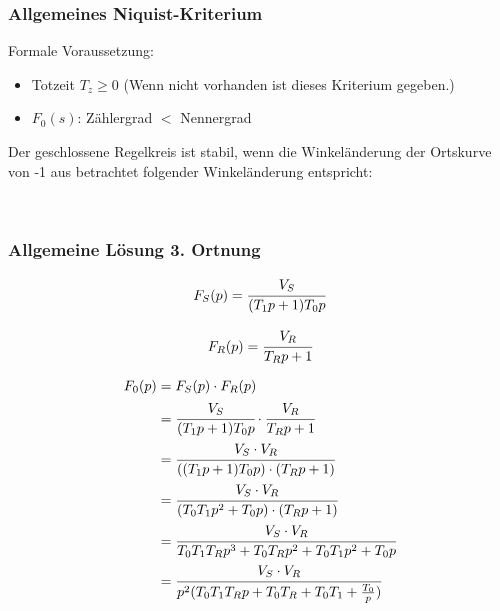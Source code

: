 \subsubsection{Allgemeines Niquist-Kriterium}

Formale Voraussetzung:

\begin{itemize}
 \item Totzeit $T_z \ge 0$ (Wenn nicht vorhanden ist dieses Kriterium gegeben.)
 \item $F_0(s)$: Zählergrad $<$ Nennergrad
\end{itemize}

Der geschlossene Regelkreis ist stabil, wenn die Winkeländerung der Ortskurve von -1 aus betrachtet folgender Winkeländerung entspricht:

\begin{minipage}{0.45\textwidth}

 \\
\end{minipage}
\begin{minipage}{0.45\textwidth}

\end{minipage}

\subsubsection{Allgemeine Lösung 3. Ortnung}

\begin{minipage}{.45\textwidth}
 \begin{equation} \label{Fstrecke}
  F_S(p) = \cfrac{V_S}{(T_1p+1)T_0p} 
\end{equation}
\end{minipage}
\begin{minipage}{.45\textwidth}
\begin{equation} \label{Fregler}
  F_R(p) = \cfrac{V_R}{T_Rp+1} 
\end{equation}
\end{minipage}

\begin{equation} \label{eg1}
\begin{split}
 F_0(p) &= F_S(p) \cdot F_R(p) \\
 &=  \cfrac{V_S}{(T_1p+1)T_0p} \cdot \cfrac{V_R}{T_Rp+1} \\
 &= \cfrac{V_S\cdot V_R}{((T_1p+1)T_0p) \cdot (T_Rp+1)} \\
 &= \cfrac{V_S\cdot V_R}{(T_0T_1p^2+T_0p) \cdot (T_Rp+1)} \\
 &= \cfrac{V_S\cdot V_R}{T_0T_1T_Rp^3+T_0T_Rp^2+T_0T_1p^2+T_0p} \\
 &= \cfrac{V_S\cdot V_R}{p^2(T_0T_1T_Rp+T_0T_R+T_0T_1+\frac{T_0}{p})} \\
 \end{split}
\end{equation}

